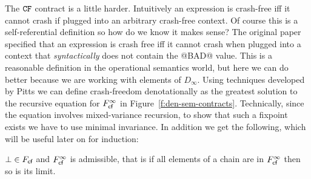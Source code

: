 The ${\tt CF}$ contract is a little harder. Intuitively an expression is crash-free iff it cannot
crash if plugged into an arbitrary crash-free context. Of course this is a 
self-referential definition so how do we know it makes sense? The original paper
\cite{xu+:contracts} specified that an expression is crash free iff it 
cannot crash when plugged into a context that {\em syntactically} does not contain the
@BAD@ value. This is a reasonable definition in the operational semantics world, but 
here we can do better because we are working with elements of $D_\infty$. Using
techniques developed by Pitts we can define crash-freedom denotationally as the greatest solution
to the recursive equation for $F_{\textsf{cf}}^{\infty}$ in Figure~\ref{f:den-sem-contracts}. Technically, 
since the equation involves mixed-variance recursion, to show that such a fixpoint exists we have 
to use minimal invariance. 
In addition we get the following, which will be useful later on for induction:
\begin{lemma}\label{lem:cf-admissible}
$\bot \in F_{\textsf{cf}}$ and $F_{\textsf{cf}}^{\infty}$ is admissible, that is if all elements of a chain are in 
$F_{\textsf{cf}}^{\infty}$ then so is its limit. 
\end{lemma}


